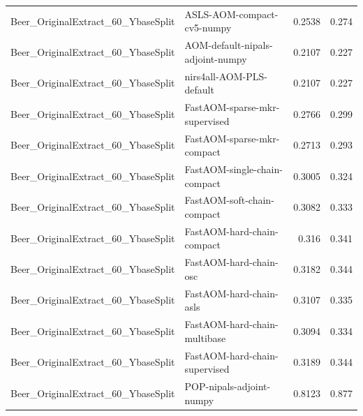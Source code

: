 \begin{landscape}
\begin{longtable}{L{8.0cm}L{9.5cm}rr}
Beer\_\allowbreak{}OriginalExtract\_\allowbreak{}60\_\allowbreak{}YbaseSplit & ASLS-\allowbreak{}AOM-\allowbreak{}compact-\allowbreak{}cv5-\allowbreak{}numpy & 0.2538 & 0.274 \\
Beer\_\allowbreak{}OriginalExtract\_\allowbreak{}60\_\allowbreak{}YbaseSplit & AOM-\allowbreak{}default-\allowbreak{}nipals-\allowbreak{}adjoint-\allowbreak{}numpy & 0.2107 & 0.227 \\
Beer\_\allowbreak{}OriginalExtract\_\allowbreak{}60\_\allowbreak{}YbaseSplit & nirs4all-\allowbreak{}AOM-\allowbreak{}PLS-\allowbreak{}default & 0.2107 & 0.227 \\
Beer\_\allowbreak{}OriginalExtract\_\allowbreak{}60\_\allowbreak{}YbaseSplit & FastAOM-\allowbreak{}sparse-\allowbreak{}mkr-\allowbreak{}supervised & 0.2766 & 0.299 \\
Beer\_\allowbreak{}OriginalExtract\_\allowbreak{}60\_\allowbreak{}YbaseSplit & FastAOM-\allowbreak{}sparse-\allowbreak{}mkr-\allowbreak{}compact & 0.2713 & 0.293 \\
Beer\_\allowbreak{}OriginalExtract\_\allowbreak{}60\_\allowbreak{}YbaseSplit & FastAOM-\allowbreak{}single-\allowbreak{}chain-\allowbreak{}compact & 0.3005 & 0.324 \\
Beer\_\allowbreak{}OriginalExtract\_\allowbreak{}60\_\allowbreak{}YbaseSplit & FastAOM-\allowbreak{}soft-\allowbreak{}chain-\allowbreak{}compact & 0.3082 & 0.333 \\
Beer\_\allowbreak{}OriginalExtract\_\allowbreak{}60\_\allowbreak{}YbaseSplit & FastAOM-\allowbreak{}hard-\allowbreak{}chain-\allowbreak{}compact & 0.316 & 0.341 \\
Beer\_\allowbreak{}OriginalExtract\_\allowbreak{}60\_\allowbreak{}YbaseSplit & FastAOM-\allowbreak{}hard-\allowbreak{}chain-\allowbreak{}osc & 0.3182 & 0.344 \\
Beer\_\allowbreak{}OriginalExtract\_\allowbreak{}60\_\allowbreak{}YbaseSplit & FastAOM-\allowbreak{}hard-\allowbreak{}chain-\allowbreak{}asls & 0.3107 & 0.335 \\
Beer\_\allowbreak{}OriginalExtract\_\allowbreak{}60\_\allowbreak{}YbaseSplit & FastAOM-\allowbreak{}hard-\allowbreak{}chain-\allowbreak{}multibase & 0.3094 & 0.334 \\
Beer\_\allowbreak{}OriginalExtract\_\allowbreak{}60\_\allowbreak{}YbaseSplit & FastAOM-\allowbreak{}hard-\allowbreak{}chain-\allowbreak{}supervised & 0.3189 & 0.344 \\
Beer\_\allowbreak{}OriginalExtract\_\allowbreak{}60\_\allowbreak{}YbaseSplit & POP-\allowbreak{}nipals-\allowbreak{}adjoint-\allowbreak{}numpy & 0.8123 & 0.877 \\

\end{longtable}
\end{landscape}
